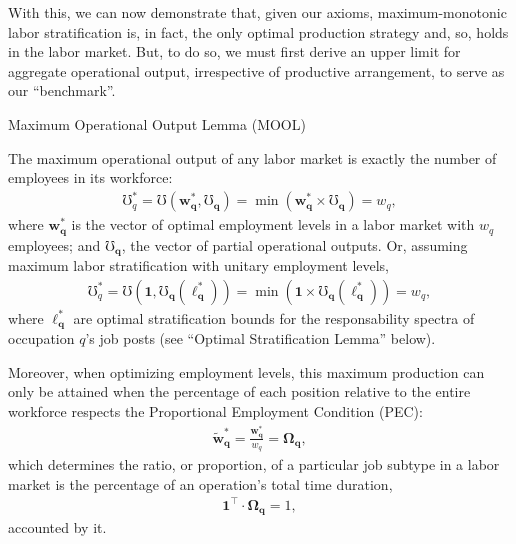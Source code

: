 \documentclass[hidelinks, nonatbib]{elsarticle}
\begin{document}
\begin{enumerate}
With this, we can now demonstrate that, given our axioms, maximum-monotonic labor stratification is, in fact, the only optimal production strategy and, so, holds in the labor market. But, to do so, we must first derive an upper limit for aggregate operational output, irrespective of productive arrangement, to serve as our ``benchmark''.

Maximum Operational Output Lemma (MOOL)

The maximum operational output of any labor market is exactly the number of employees in its workforce:
    \begin{gather}
        \mho_{q}^{*}
        =
        \mho(
            \boldsymbol{w_{q}^{*}},
            \boldsymbol{\mho_q}
        ) = 
        \min(
            \boldsymbol{w_{q}^{*}}
            \times
            \boldsymbol{\mho_q}
        )
        = w_q
        ,
    \end{gather}
    where $\boldsymbol{w_{q}^{*}}$ is the vector of optimal employment levels in a labor market with $w_q$ employees; and $\boldsymbol{\mho_q}$, the vector of partial operational outputs. Or, assuming maximum labor stratification with unitary employment levels,
    \begin{gather}
        \mho_{q}^{*}
        =
        \mho(
            \boldsymbol{1},
            \boldsymbol{\mho_q}(
                \boldsymbol{\ell_{q}^{*}}
            )
        )
        =
        \min(
            \boldsymbol{1}
            \times
            \boldsymbol{\mho_q}(
                \boldsymbol{\ell_{q}^{*}}
            )
        )
        = w_q
        ,
    \end{gather}
    where $\boldsymbol{\ell_{q}^{*}}$ are optimal stratification bounds for the responsability spectra of occupation $q$'s job posts (see ``Optimal Stratification Lemma'' below).
    
    Moreover, when optimizing employment levels, this maximum production can only be attained when the percentage of each position relative to the entire workforce respects the Proportional Employment Condition (PEC):
    \begin{gather}
        \boldsymbol{\tilde{w}_{q}^{*}}
        =
        \frac{
            \boldsymbol{w_{q}^{*}}
        }{
            w_q
        }
        =
        \boldsymbol{\Omega_{q}}
        ,
    \end{gather}
    which determines the ratio, or proportion, of a particular job subtype in a labor market is the percentage of an operation's total time duration,
    \begin{gather}
        \boldsymbol{1} ^ {\top}
        \cdot
        \boldsymbol{\Omega_{q}}
        = 1
        ,
    \end{gather}
    accounted by it.
    

\end{enumerate}
\end{document}

